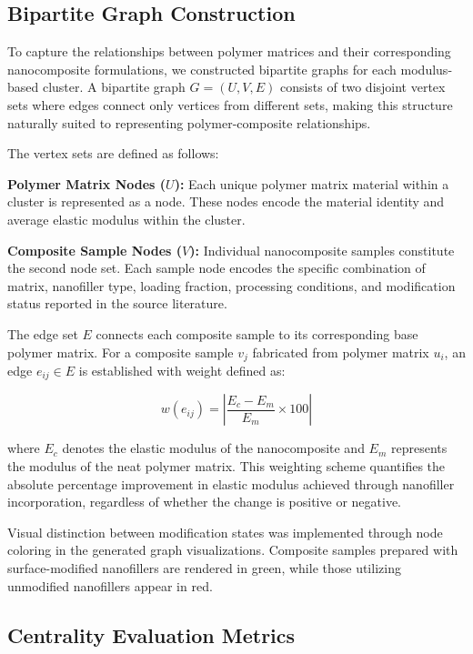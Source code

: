 \documentclass[conference]{IEEEtran}
\begin{document}
\subsection{Bipartite Graph Construction}

To capture the relationships between polymer matrices and their corresponding nanocomposite formulations, we constructed bipartite graphs for each modulus-based cluster. A bipartite graph $G = (U, V, E)$ consists of two disjoint vertex sets where edges connect only vertices from different sets, making this structure naturally suited to representing polymer-composite relationships.

The vertex sets are defined as follows:

\textbf{Polymer Matrix Nodes ($U$):} Each unique polymer matrix material within a cluster is represented as a node. These nodes encode the material identity and average elastic modulus within the cluster.

\textbf{Composite Sample Nodes ($V$):} Individual nanocomposite samples constitute the second node set. Each sample node encodes the specific combination of matrix, nanofiller type, loading fraction, processing conditions, and modification status reported in the source literature.

The edge set $E$ connects each composite sample to its corresponding base polymer matrix. For a composite sample $v_j$ fabricated from polymer matrix $u_i$, an edge $e_{ij} \in E$ is established with weight defined as:

\begin{equation}
w(e_{ij}) = \left| \frac{E_c - E_m}{E_m} \times 100 \right|
\label{eq:weight}
\end{equation}

where $E_c$ denotes the elastic modulus of the nanocomposite and $E_m$ represents the modulus of the neat polymer matrix. This weighting scheme quantifies the absolute percentage improvement in elastic modulus achieved through nanofiller incorporation, regardless of whether the change is positive or negative.

Visual distinction between modification states was implemented through node coloring in the generated graph visualizations. Composite samples prepared with surface-modified nanofillers are rendered in green, while those utilizing unmodified nanofillers appear in red.

\subsection{Centrality Evaluation Metrics}
\end{document}
